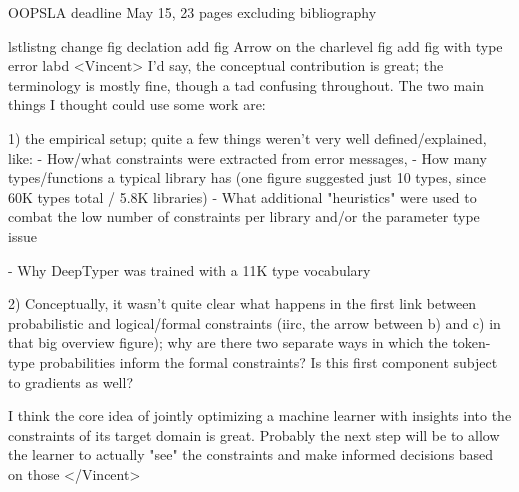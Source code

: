  OOPSLA deadline May 15, 23 pages excluding bibliography

lstlistng
change fig declation
add fig
Arrow on the charlevel fig
add fig with type error labd
<Vincent>
I'd say, the conceptual contribution is great; the terminology is mostly
fine, though a tad confusing throughout. The two main things I thought could
use some work are:

1) the empirical setup; quite a few things weren't very well
defined/explained, like:
  - How/what constraints were extracted from error messages,
  - How many types/functions a typical library has (one figure suggested
just 10 types, since 60K types total / 5.8K libraries)
  - What additional "heuristics" were used to combat the low number of
constraints per library and/or the parameter type issue

  - Why DeepTyper was trained with a 11K type vocabulary
  
2) Conceptually, it wasn't quite clear what happens in the first link
between probabilistic and logical/formal constraints (iirc, the arrow
between b) and c) in that big overview figure); why are there two separate
ways in which the token-type probabilities inform the formal constraints? Is
this first component subject to gradients as well?

I think the core idea of jointly optimizing a machine learner with insights
into the constraints of its target domain is great. Probably the next step
will be to allow the learner to actually "see" the constraints and make
informed decisions based on those </Vincent>
